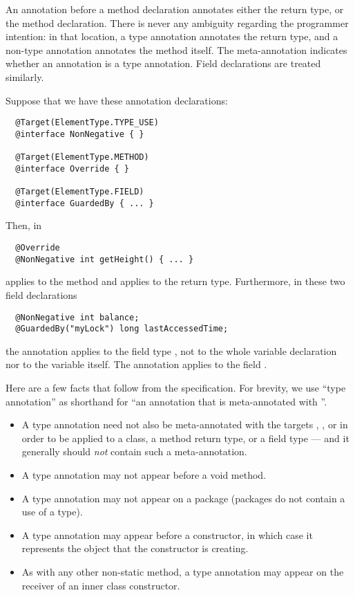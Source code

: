 \documentclass[10pt]{article}
\begin{document}
An annotation before a method declaration annotates either the return type,
or the method declaration.  There is never any ambiguity regarding the
programmer intention:  in that location, a type annotation annotates the
return type, and a non-type annotation annotates the method itself.  The
 meta-annotation indicates whether an annotation is a type
annotation.  Field declarations are treated similarly.



Suppose that we have these annotation declarations:
\begin{Verbatim}
  @Target(ElementType.TYPE_USE)
  @interface NonNegative { }

  @Target(ElementType.METHOD)
  @interface Override { }

  @Target(ElementType.FIELD)
  @interface GuardedBy { ... }
\end{Verbatim}
Then, in
\begin{Verbatim}
  @Override
  @NonNegative int getHeight() { ... }
\end{Verbatim}
 applies to the method and  applies
to the return type.
Furthermore, in these two field declarations
\begin{Verbatim}
  @NonNegative int balance;
  @GuardedBy("myLock") long lastAccessedTime;
\end{Verbatim}
the annotation  applies to the field type ,
not to the whole variable declaration nor to the variable 
itself.  The annotation  applies to the
field .

Here are a few facts that follow from the specification.  For brevity, we
use ``type annotation'' as shorthand for ``an annotation that is
meta-annotated with ''.
\begin{itemize}
\item
A type
annotation need not also be meta-annotated with the targets
, , or
 in order to be applied to a class, a method return
type, or a field type --- and it generally should \emph{not} contain such a
 meta-annotation.
\item
  A type annotation may not appear before a void method.
\item
A type
annotation may not appear on a package (packages do not contain a use of a type).
\item
A type annotation may appear before a 
constructor, in which case it represents the object that the constructor is
creating.
\item
  As with any other non-static method, a type annotation may
appear on the receiver of an inner class constructor.
\end{itemize}
\end{document}

